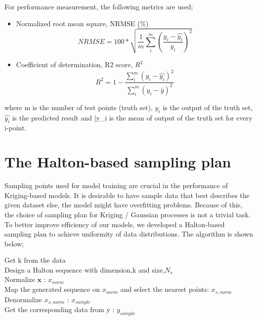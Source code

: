 \documentclass[11pt, letterpaper]{article}
\begin{document}
For performance measurement, the following metrics are used;
\begin{itemize}
    \item Normalized root mean square, NRMSE (\%)
    \begin{equation}
\label{nrmse}
		NRMSE = 100 * \sqrt{\frac{1}{m}\sum_{i}^{m}\left(\frac{y_i - \hat{y_i}}{y_i}\right)^2}
		\end{equation}
    
    \item Coefficient of determination, R2 score, $R^2$
        \begin{equation}
		R^2  =  1- \frac{\sum_{i}^{m}\left(y_i - \hat{y_i}\right)^2}{\sum_{i}^{m}\left(y_i - \bar{y}\right)^2}
		\end{equation}
\end{itemize}
where m is the number of test points (truth set), $y_i$ is the output of the truth set,  $\hat{y_i}$ is the predicted result and \bar{y_i} is the mean of output of the truth set for every i-point.


\section{The Halton-based sampling plan}
Sampling points used for model training are crucial in the performance of Kriging-based models. It is desirable to have sample data that best describes the given dataset else, the model might have overfitting problems. Because of this, the choice of sampling plan for Kriging / Gaussian processes is not a trivial task. To better improve efficiency of our models, we developed a Halton-based sampling plan to achieve uniformity of data distributions. The algorithm is shown below;
    \begin{algorithm}[H]
\DontPrintSemicolon
  
  Get k from the data\\
  Design a Halton sequence with dimension,k and size,$N_s$\\
  Normalize $\mathbf{x}$ : $x_{norm}$\\
  Map the generated sequence on $x_{norm}$ and select the  nearest points: $x_{s,norm}$\\
  Denormalize $x_{s,norm}$ : $x_{sample}$\\
  Get the corresponding data from y : $y_{sample}$
\end{algorithm}
\end{document}
